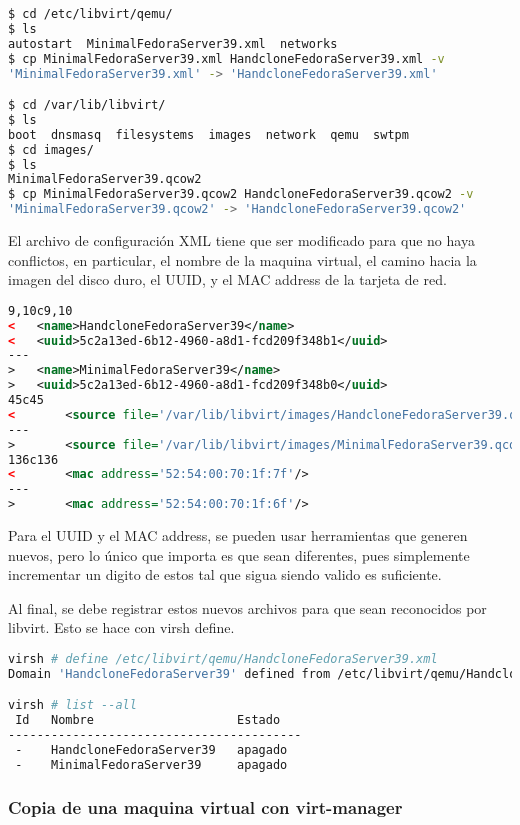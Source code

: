 \documentclass[spanish]{article}
\begin{document}
\begin{lstlisting}[language=bash,breaklines=true]
$ cd /etc/libvirt/qemu/
$ ls
autostart  MinimalFedoraServer39.xml  networks
$ cp MinimalFedoraServer39.xml HandcloneFedoraServer39.xml -v
'MinimalFedoraServer39.xml' -> 'HandcloneFedoraServer39.xml'

$ cd /var/lib/libvirt/
$ ls
boot  dnsmasq  filesystems  images  network  qemu  swtpm
$ cd images/
$ ls
MinimalFedoraServer39.qcow2
$ cp MinimalFedoraServer39.qcow2 HandcloneFedoraServer39.qcow2 -v
'MinimalFedoraServer39.qcow2' -> 'HandcloneFedoraServer39.qcow2'
\end{lstlisting}

El archivo de configuración XML tiene que ser modificado para que no haya conflictos,
en particular, el nombre de la maquina virtual, el camino
hacia la imagen del disco duro, el UUID, y el MAC address de la tarjeta de red. 

\begin{lstlisting}[language=xml,breaklines=true]
9,10c9,10
<   <name>HandcloneFedoraServer39</name>
<   <uuid>5c2a13ed-6b12-4960-a8d1-fcd209f348b1</uuid>
---
>   <name>MinimalFedoraServer39</name>
>   <uuid>5c2a13ed-6b12-4960-a8d1-fcd209f348b0</uuid>
45c45
<       <source file='/var/lib/libvirt/images/HandcloneFedoraServer39.qcow2'/>
---
>       <source file='/var/lib/libvirt/images/MinimalFedoraServer39.qcow2'/>
136c136
<       <mac address='52:54:00:70:1f:7f'/>
---
>       <mac address='52:54:00:70:1f:6f'/>
\end{lstlisting}

Para el UUID y el MAC address, se pueden usar herramientas que generen nuevos,
pero lo único que importa es que sean diferentes, pues simplemente incrementar
un digito de estos tal que sigua siendo valido es suficiente.

Al final, se debe registrar estos nuevos archivos para que sean
reconocidos por libvirt. Esto se hace con virsh define.

\begin{lstlisting}[language=bash,breaklines=true]
virsh # define /etc/libvirt/qemu/HandcloneFedoraServer39.xml 
Domain 'HandcloneFedoraServer39' defined from /etc/libvirt/qemu/HandcloneFedoraServer39.xml

virsh # list --all
 Id   Nombre                    Estado
-----------------------------------------
 -    HandcloneFedoraServer39   apagado
 -    MinimalFedoraServer39     apagado
\end{lstlisting}


\subsubsection{Copia de una maquina virtual con virt-manager}
\end{document}
